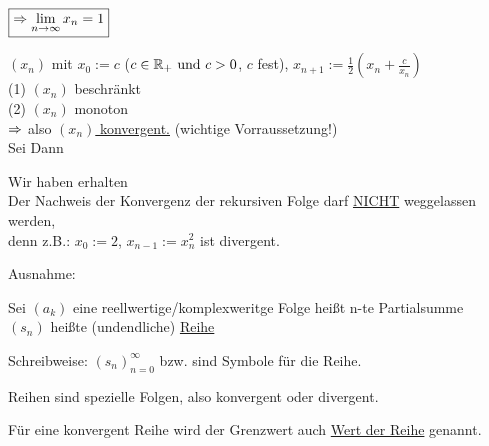 \documentclass{../tudscript}
\begin{document}
			$\boxed{\Rightarrow \lim_{n \to \infty} x_n = 1}$
		
		$(x_n)$ mit $x_0 := c$ ($c \in \mathbb{R}_{+} \text{ und } c > 0$, $c$ fest), $x_{n+1} := \frac{1}{2} (x_n + \frac{c}{x_n})$ \\
		(1) $(x_n)$ beschränkt \\
		(2) $(x_n)$ monoton \\
		$\Rightarrow$ also \underline{$(x_n)$ konvergent.} (wichtige Vorraussetzung!) \\
		
		Sei  Dann
		
		Wir haben  erhalten \\
		
		Der Nachweis der Konvergenz der rekursiven Folge darf \underline{NICHT} weggelassen werden, \\
		denn z.B.: $x_0 := 2$, $x_{n-1} := x^2_n$ ist divergent. \\
	
		Ausnahme:
	
		Sei $(a_k)$ eine reellwertige/komplexweritge Folge
		heißt n-te Partialsumme\\
			
		$(s_n)$ heißte (undendliche) \underline{Reihe}
		
		Schreibweise: $(s_n)^{\infty}_{n=0}$ bzw.
		sind Symbole für die Reihe.
		
		Reihen sind spezielle Folgen, also konvergent oder divergent.
		
		Für eine konvergent Reihe wird der Grenzwert auch \underline{Wert der Reihe} genannt.
		
\end{document}
